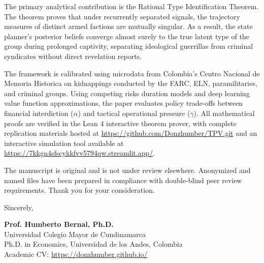 \documentclass[11pt]{article}
\begin{document}
\vspace{0.5em}

\noindent The primary analytical contribution is the Rational Type Identification Theorem. The theorem proves that under recurrently separated signals, the trajectory measures of distinct armed factions are mutually singular. As a result, the state planner's posterior beliefs converge almost surely to the true latent type of the group during prolonged captivity, separating ideological guerrillas from criminal syndicates without direct revelation reports.

\vspace{0.5em}

\noindent The framework is calibrated using microdata from Colombia's Centro Nacional de Memoria Historica on kidnappings conducted by the FARC, ELN, paramilitaries, and criminal groups. Using competing risks duration models and deep learning value function approximations, the paper evaluates policy trade-offs between financial interdiction ($\alpha$) and tactical operational pressure ($\gamma$). All mathematical proofs are verified in the Lean 4 interactive theorem prover, with complete replication materials hosted at \url{https://github.com/Donzhumber/TPV.git} and an interactive simulation tool available at \url{https://7kkgn4sfscykkfvv5794qw.streamlit.app/}.

\vspace{0.5em}

\noindent The manuscript is original and is not under review elsewhere. Anonymized and named files have been prepared in compliance with double-blind peer review requirements. Thank you for your consideration.

\vspace{1.2em}

\begin{flushleft}
Sincerely,

\vspace{1.0em}

\textbf{Prof. Humberto Bernal, Ph.D.} \\
Universidad Colegio Mayor de Cundinamarca \\
Ph.D. in Economics, Universidad de los Andes, Colombia \\
Academic CV: \url{https://donzhumber.github.io/}
\end{flushleft}
\end{document}
